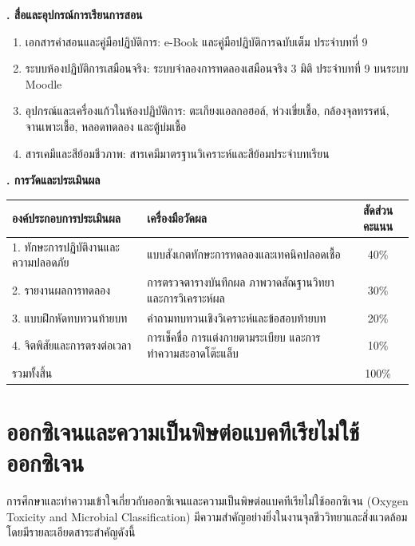 \noindent\textbf{. สื่อและอุปกรณ์การเรียนการสอน}

\begin{enumerate}
    \item เอกสารคำสอนและคู่มือปฏิบัติการ: e-Book และคู่มือปฏิบัติการฉบับเต็ม ประจำบทที่ 9
    \item ระบบห้องปฏิบัติการเสมือนจริง: ระบบจำลองการทดลองเสมือนจริง 3 มิติ ประจำบทที่ 9 บนระบบ Moodle
    \item อุปกรณ์และเครื่องแก้วในห้องปฏิบัติการ: ตะเกียงแอลกอฮอล์, ห่วงเขี่ยเชื้อ, กล้องจุลทรรศน์, จานเพาะเชื้อ, หลอดทดลอง และตู้บ่มเชื้อ
    \item สารเคมีและสีย้อมชีวภาพ: สารเคมีมาตรฐานวิเคราะห์และสีย้อมประจำบทเรียน
\end{enumerate}

\noindent\textbf{. การวัดและประเมินผล}

\begin{table}[H]
\centering\small
\begin{tabularx}{\textwidth}{p{} p{} c}
\toprule
\textbf{องค์ประกอบการประเมินผล} & \textbf{เครื่องมือวัดผล} & \textbf{สัดส่วนคะแนน} \\
\midrule
1. ทักษะการปฏิบัติงานและความปลอดภัย & แบบสังเกตทักษะการทดลองและเทคนิคปลอดเชื้อ & 40\% \\
2. รายงานผลการทดลอง & การตรวจตารางบันทึกผล ภาพวาดสัณฐานวิทยา และการวิเคราะห์ผล & 30\% \\
3. แบบฝึกหัดทบทวนท้ายบท & คำถามทบทวนเชิงวิเคราะห์และข้อสอบท้ายบท & 20\% \\
4. จิตพิสัยและการตรงต่อเวลา & การเช็คชื่อ การแต่งกายตามระเบียบ และการทำความสะอาดโต๊ะแล็บ & 10\% \\
รวมทั้งสิ้น &  & 100\% \\
\bottomrule
\end{tabularx}
\end{table}

\newpage


\section{ออกซิเจนและความเป็นพิษต่อแบคทีเรียไม่ใช้ออกซิเจน}

การศึกษาและทำความเข้าใจเกี่ยวกับออกซิเจนและความเป็นพิษต่อแบคทีเรียไม่ใช้ออกซิเจน (Oxygen Toxicity and Microbial Classification) มีความสำคัญอย่างยิ่งในงานจุลชีววิทยาและสิ่งแวดล้อม โดยมีรายละเอียดสาระสำคัญดังนี้

